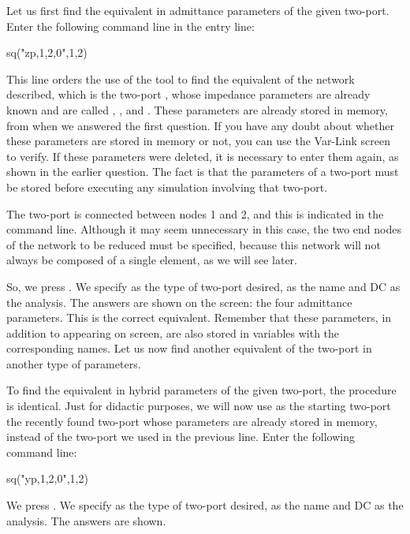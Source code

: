 Let us first find the equivalent in admittance parameters of the
given two-port. Enter the following command line in the entry line:

\begin{entry}
sq\port("zp,1,2,0",1,2)
\end{entry}

This line orders the use of the  tool to find the
equivalent of the network described, which is the two-port
, whose impedance parameters are already known and are
called , ,  and . These
parameters are already stored in memory, from when we answered the
first question. If you have any doubt about whether these parameters
are stored in memory or not, you can use the Var-Link screen to
verify. If these parameters were deleted, it is necessary to enter
them again, as shown in the earlier question. The fact is that the
parameters of a two-port must be stored before executing any
simulation involving that two-port.

The two-port is connected between nodes 1 and 2, and this is
indicated in the command line. Although it may seem unnecessary in
this case, the two end nodes of the network to be reduced must be
specified, because this network will not always be composed of a
single element, as we will see later.

So, we press . We specify  as the type of
two-port desired,  as the name and DC as the analysis. The
answers are shown on the screen: the four admittance parameters.
This is the correct equivalent. Remember that these parameters, in
addition to appearing on screen, are also stored in variables with
the corresponding names. Let us now find another equivalent of the
two-port in another type of parameters.

To find the equivalent in hybrid parameters of the given two-port,
the procedure is identical. Just for didactic purposes, we will now
use as the starting two-port the recently found two-port 
whose parameters are already stored in memory, instead of the
two-port  we used in the previous line. Enter the following
command line:

\begin{entry}
sq\port("yp,1,2,0",1,2)
\end{entry}

We press . We specify  as the type of two-port
desired,  as the name and DC as the analysis. The answers
are shown.

